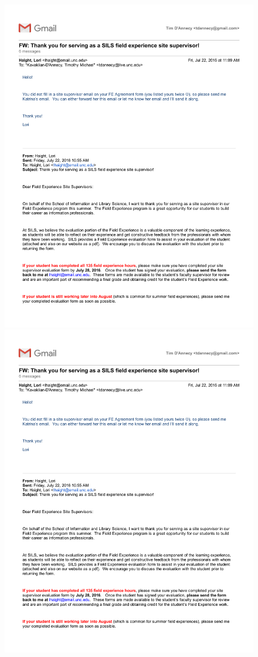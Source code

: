 \begin{figure}
  \centering
    \noindent\includegraphics[page=3,width=.45\textwidth]{documents/2016-07-22-Email-Lori-Tim} \hfill
    \noindent\includegraphics[page=4,width=.45\textwidth]{documents/2016-07-22-Email-Lori-Tim}
\end{figure}


